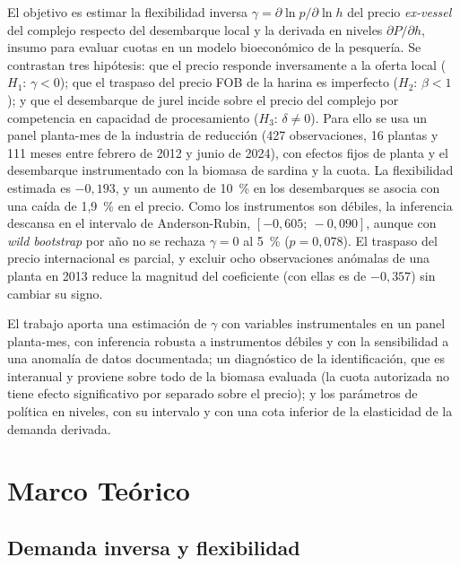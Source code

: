 \documentclass[11pt]{article}
\begin{document}
El objetivo es estimar la flexibilidad inversa $\gamma=\partial\ln p/\partial\ln h$ del precio \textit{ex-vessel} del complejo respecto del desembarque local y la derivada en niveles $\partial P/\partial h$, insumo para evaluar cuotas en un modelo bioeconómico de la pesquería. Se contrastan tres hipótesis: que el precio responde inversamente a la oferta local ($H_1$: $\gamma<0$); que el traspaso del precio FOB de la harina es imperfecto ($H_2$: $\beta<1$); y que el desembarque de jurel incide sobre el precio del complejo por competencia en capacidad de procesamiento ($H_3$: $\delta\neq0$). Para ello se usa un panel planta-mes de la industria de reducción (427 observaciones, 16 plantas y 111 meses entre febrero de 2012 y junio de 2024), con efectos fijos de planta y el desembarque instrumentado con la biomasa de sardina y la cuota. La flexibilidad estimada es $-0{,}193$, y un aumento de 10~\% en los desembarques se asocia con una caída de 1,9~\% en el precio. Como los instrumentos son débiles, la inferencia descansa en el intervalo de Anderson-Rubin, $[-0{,}605;\ -0{,}090]$, aunque con \textit{wild bootstrap} por año no se rechaza $\gamma=0$ al 5~\% ($p=0{,}078$). El traspaso del precio internacional es parcial, y excluir ocho observaciones anómalas de una planta en 2013 reduce la magnitud del coeficiente (con ellas es de $-0{,}357$) sin cambiar su signo.

El trabajo aporta una estimación de $\gamma$ con variables instrumentales en un panel planta-mes, con inferencia robusta a instrumentos débiles y con la sensibilidad a una anomalía de datos documentada; un diagnóstico de la identificación, que es interanual y proviene sobre todo de la biomasa evaluada (la cuota autorizada no tiene efecto significativo por separado sobre el precio); y los parámetros de política en niveles, con su intervalo y con una cota inferior de la elasticidad de la demanda derivada.
\section{Marco Teórico}\label{sec:theory}
\subsection{Demanda inversa y flexibilidad}\label{sec:inversa}
\end{document}
